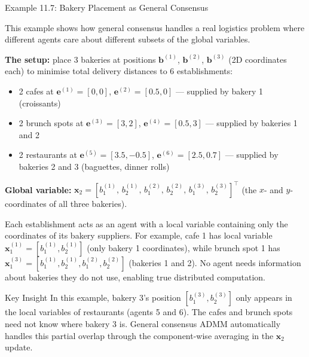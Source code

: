\documentclass[aspectratio=169,10pt]{beamer}
\newcommand{\bx}{\mathbf{x}}
\begin{document}
\begin{frame}[allowframebreaks]{Example 11.7: Bakery Placement as General Consensus}

  This example shows how general consensus handles a real logistics problem
  where different agents care about different subsets of the global variables.

  \textbf{The setup:} place 3 bakeries at positions
  $\mathbf{b}^{(1)}$, $\mathbf{b}^{(2)}$, $\mathbf{b}^{(3)}$ (2D coordinates each)
  to minimise total delivery distances to 6 establishments:
  \begin{itemize}
    \item 2 cafes at $\mathbf{e}^{(1)} = [0, 0]$,
          $\mathbf{e}^{(2)} = [0.5, 0]$ --- supplied by bakery 1 (croissants)
    \item 2 brunch spots at $\mathbf{e}^{(3)} = [3, 2]$,
          $\mathbf{e}^{(4)} = [0.5, 3]$ --- supplied by bakeries 1 and 2
    \item 2 restaurants at $\mathbf{e}^{(5)} = [3.5, -0.5]$,
          $\mathbf{e}^{(6)} = [2.5, 0.7]$ --- supplied by bakeries 2 and 3 (baguettes, dinner rolls)
  \end{itemize}

  \medskip
  \textbf{Global variable:}
  $\bx_2 = [b_1^{(1)},\, b_2^{(1)},\, b_1^{(2)},\, b_2^{(2)},\, b_1^{(3)},\, b_2^{(3)}]^\top$
  (the $x$- and $y$-coordinates of all three bakeries).

  \medskip
  Each establishment acts as an agent with a local variable containing
  only the coordinates of its bakery suppliers.  For example, cafe 1 has
  local variable $\bx_1^{(1)} = [b_1^{(1)}, b_2^{(1)}]$ (only bakery 1
  coordinates), while brunch spot 1 has
  $\bx_1^{(3)} = [b_1^{(1)}, b_2^{(1)}, b_1^{(2)}, b_2^{(2)}]$
  (bakeries 1 and 2).  No agent needs information about bakeries they
  do not use, enabling true distributed computation.

  \begin{alertblock}{Key Insight}
    In this example, bakery 3's position $[b_1^{(3)}, b_2^{(3)}]$ only
    appears in the local variables of restaurants (agents 5 and 6).
    The cafes and brunch spots need not know where bakery 3 is.
    General consensus ADMM automatically handles this partial overlap
    through the component-wise averaging in the $\bx_2$ update.
  \end{alertblock}

\end{frame}

\end{document}
